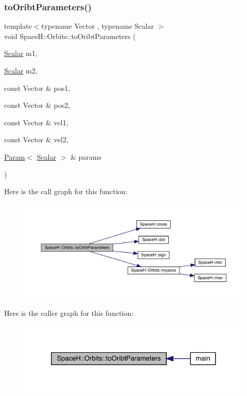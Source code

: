 \subsubsection{\texorpdfstring{to\+Oribt\+Parameters()}{toOribtParameters()}}
{\footnotesize\ttfamily template$<$typename Vector , typename Scalar $>$ \\
void Space\+H\+::\+Orbits\+::to\+Oribt\+Parameters (\begin{DoxyParamCaption}\item[{\mbox{\hyperlink{create_kepler_8cpp_a8c2981f3f834be9448a6ab06c28748eb}{Scalar}}}]{m1,  }\item[{\mbox{\hyperlink{create_kepler_8cpp_a8c2981f3f834be9448a6ab06c28748eb}{Scalar}}}]{m2,  }\item[{const Vector \&}]{pos1,  }\item[{const Vector \&}]{pos2,  }\item[{const Vector \&}]{vel1,  }\item[{const Vector \&}]{vel2,  }\item[{\mbox{\hyperlink{struct_space_h_1_1_orbits_1_1_param}{Param}}$<$ \mbox{\hyperlink{create_kepler_8cpp_a8c2981f3f834be9448a6ab06c28748eb}{Scalar}} $>$ \&}]{params }\end{DoxyParamCaption})\hspace{0.3cm}{\ttfamily [inline]}}

Here is the call graph for this function\+:
\nopagebreak
\begin{figure}[H]
\begin{center}
\leavevmode
\includegraphics[width=350pt]{namespace_space_h_1_1_orbits_a5e8b37a1237e17770907f5c2adbb53d6_cgraph}
\end{center}
\end{figure}
Here is the caller graph for this function\+:
\nopagebreak
\begin{figure}[H]
\begin{center}
\leavevmode
\includegraphics[width=325pt]{namespace_space_h_1_1_orbits_a5e8b37a1237e17770907f5c2adbb53d6_icgraph}
\end{center}
\end{figure}
